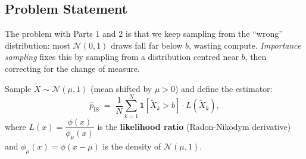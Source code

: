 \documentclass[12pt]{article}
\begin{document}
\subsection*{Problem Statement}

The problem with Parts 1 and 2 is that we keep sampling from the ``wrong'' distribution:
most $\mathcal{N}(0,1)$ draws fall far below $b$, wasting compute.
\emph{Importance sampling} fixes this by sampling from a distribution centred near $b$,
then correcting for the change of measure.

Sample $\tilde{X} \sim \mathcal{N}(\mu, 1)$ (mean shifted by $\mu > 0$) and define the estimator:
\[
  \hat{p}_{\mathrm{IS}} \;=\; \frac{1}{N}\sum_{k=1}^{N} \mathbf{1}[\tilde{X}_k > b]\cdot L(\tilde{X}_k),
\]
where $L(x) = \dfrac{\phi(x)}{\phi_\mu(x)}$ is the \textbf{likelihood ratio} (Radon-Nikodym derivative)
and $\phi_\mu(x) = \phi(x - \mu)$ is the density of $\mathcal{N}(\mu,1)$.
\end{document}

